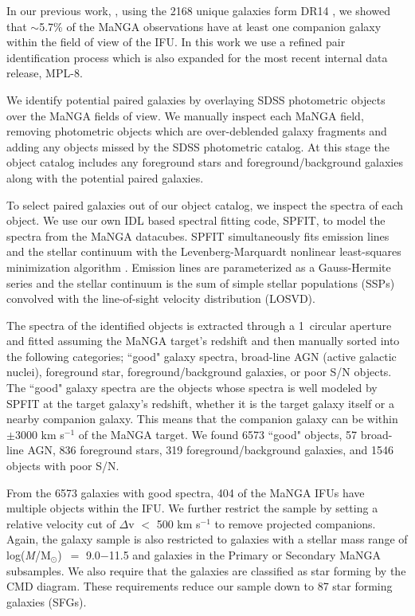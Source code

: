 \documentclass[iop,revtex4,twocolumn,apj,numberedappendix,appendixfloats]{emulateapj}
\newcommand{\logm}{log({\it M}/M$_{\odot}$)}
\begin{document}
In our previous work, \citet{Fu:2018}, using the 2168 unique galaxies form DR14 \citep{Abolfathi:2018}, we showed that $\sim$5.7\% of the MaNGA observations have at least one companion galaxy within the field of view of the IFU. In this work we use a refined pair identification process which is also expanded for the most recent internal data release, MPL-8.

We identify potential paired galaxies by overlaying SDSS photometric objects over the MaNGA fields of view. We manually inspect each MaNGA field, removing photometric objects which are over-deblended galaxy fragments and adding any objects missed by the SDSS photometric catalog. At this stage the object catalog includes any foreground stars and foreground/background galaxies along with the potential paired galaxies. 

To select paired galaxies out of our object catalog, we inspect the spectra of each object. We use our own {\sc IDL} based spectral fitting code, {\sc SPFIT}, to model the spectra from the MaNGA datacubes. {\sc SPFIT} simultaneously fits emission lines and the stellar continuum with the Levenberg-Marquardt nonlinear least-squares minimization algorithm \citep{Fu:2018}. Emission lines are parameterized as a Gauss-Hermite series and the stellar continuum is the sum of simple stellar populations (SSPs) convolved with the line-of-sight velocity distribution (LOSVD).

The spectra of the identified objects is extracted through a 1\arcsec\ circular aperture and fitted assuming the MaNGA target's redshift and then manually sorted into the following categories; ``good" galaxy spectra, broad-line AGN (active galactic nuclei), foreground star, foreground/background galaxies, or poor S/N objects. The ``good" galaxy spectra are the objects whose spectra is well modeled by {\sc SPFIT} at the target galaxy's redshift, whether it is the target galaxy itself or a nearby companion galaxy. This means that the companion galaxy can be within $\pm$3000 km s$^{-1}$ of the MaNGA target. We found 6573 ``good" objects, 57 broad-line AGN, 836 foreground stars, 319 foreground/background galaxies, and 1546 objects with poor S/N. 

From the 6573 galaxies with good spectra, 404 of the MaNGA IFUs have multiple objects within the IFU. We further restrict the sample by setting a relative velocity cut of $\Delta$v $<$ 500 km s$^{-1}$ to remove projected companions. Again, the galaxy sample is also restricted to galaxies with a stellar mass range of \logm\ $=$ 9.0$-$11.5 and galaxies in the Primary or Secondary MaNGA subsamples. We also require that the galaxies are classified as star forming by the CMD diagram. These requirements reduce our sample down to 87 star forming galaxies (SFGs). 
\end{document}
